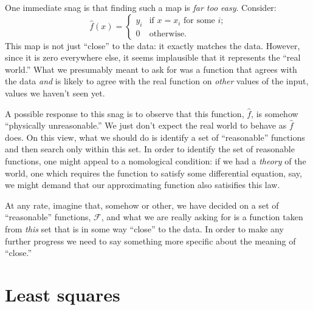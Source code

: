 \documentclass[10pt, a4paper]{article}
\begin{document}
One immediate snag is that finding such a map is \emph{far too
  easy}. Consider:
\begin{equation*}
  \hat{f}(x) =
  \begin{cases}
    y_i & \text{if $x = x_i$ for some $i$;} \\
      0 & \text{otherwise}.
  \end{cases}
\end{equation*}
This map is not just “close” to the data: it exactly matches the
data. However, since it is zero everywhere else, it seems implausible
that it represents the “real world.” What we presumably meant to ask
for was a function that agrees with the data \emph{and} is likely to
agree with the real function on \emph{other} values of the input,
values we haven't seen yet.

A possible response to this snag is to observe that this function,
$\hat{f}$, is somehow “physically unreasonable.” We just don't expect
the real world to behave as $\hat{f}$ does. On this view, what we
should do is identify a set of “reasonable” functions and then search
only within this set. In order to identify the set of reasonable
functions, one might appeal to a nomological condition: if we had a
\emph{theory} of the world, one which requires the function to satisfy
some differential equation, say, we might demand that our
approximating function also satisifies this law.

At any rate, imagine that, somehow or other, we have decided on a set
of “reasonable” functions, $\mathcal{F}$, and what we are really asking for is a
function taken from \emph{this} set that is in some way “close” to the
data. In order to
make any further progress we need to say something more specific about
the meaning of “close.”

\section{Least squares}
\end{document}
